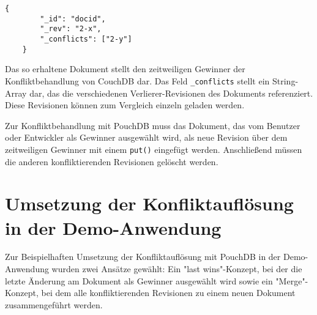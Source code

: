 \begin{codebox}
	\begin{lstlisting}[style=typescript]
	{
		"_id": "docid",
		"_rev": "2-x",
		"_conflicts": ["2-y"]
	}
	\end{lstlisting}
\end{codebox}

Das so erhaltene Dokument stellt den zeitweiligen Gewinner der Konfliktbehandlung von CouchDB dar.
Das Feld \texttt{\_conflicts} stellt ein String-Array dar, das die verschiedenen Verlierer-Revisionen des Dokuments referenziert. Diese Revisionen können zum Vergleich einzeln geladen werden.

Zur Konfliktbehandlung mit PouchDB muss das Dokument, das vom Benutzer oder Entwickler als Gewinner ausgewählt wird, als neue Revision über dem zeitweiligen Gewinner mit einem \texttt{put()} eingefügt werden. Anschließend müssen die anderen konfliktierenden Revisionen gelöscht werden.

\section{Umsetzung der Konfliktauflösung in der Demo-Anwendung}

Zur Beispielhaften Umsetzung der Konfliktauflösung mit PouchDB in der Demo-Anwendung wurden zwei Ansätze gewählt: Ein "last wins"-Konzept, bei der die letzte Änderung am Dokument als Gewinner ausgewählt wird sowie ein "Merge"-Konzept, bei dem alle konfliktierenden Revisionen zu einem neuen Dokument zusammengeführt werden.